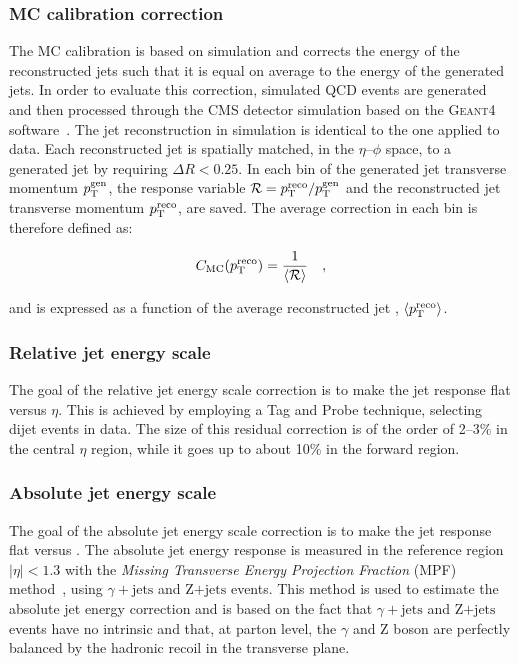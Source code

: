 \subsubsection{MC calibration correction}

The MC calibration is based on simulation and corrects the energy of the reconstructed jets such that it is equal on average to the energy of the generated jets. In order to evaluate this correction, simulated QCD events are generated and then processed through the CMS detector simulation based on the \textsc{Geant4} software~\cite{Agostinelli:2002hh}. The jet reconstruction in simulation is identical to the one applied to data. Each reconstructed jet is spatially matched, in the $\eta$--$\phi$ space, to a generated jet by requiring $\Delta R < 0.25$. In each bin of the generated jet transverse momentum $p_\mathrm{T}^\mathrm{gen}$, the response variable $\mathcal{R}=p_\mathrm{T}^\mathrm{reco}/p_\mathrm{T}^\mathrm{gen}$ and the reconstructed jet transverse momentum $p_\mathrm{T}^\mathrm{reco}$, are saved. The average correction in each bin is therefore defined as:

\begin{equation}
C_\mathrm{MC}(p_\mathrm{T}^\mathrm{reco}) = \frac{1}{\langle \mathcal{R} \rangle} \quad,
\end{equation}

\noindent and is expressed as a function of the average reconstructed jet \pt, $\langle p_\mathrm{T}^\mathrm{reco} \rangle$.

\subsubsection{Relative jet energy scale}

The goal of the relative jet energy scale correction is to make the jet response flat versus $\eta$. This is achieved by employing a Tag and Probe technique, selecting dijet events in data. The size of this residual correction is of the order of 2--3\% in the central $\eta$ region, while it goes up to about 10\% in the forward region.

\subsubsection{Absolute jet energy scale}

The goal of the absolute jet energy scale correction is to make the jet response flat versus \pt. The absolute jet energy response is measured in the reference region $|\eta|<1.3$ with the \emph{Missing Transverse Energy Projection Fraction} (MPF) method~\cite{Abbott:1998xw}, using $\gamma+\mathrm{jets}$ and Z$+\mathrm{jets}$ events. This method is used to estimate the absolute jet energy correction and is based on the fact that $\gamma+\mathrm{jets}$ and Z$+\mathrm{jets}$ events have no intrinsic \MET and that, at parton level, the $\gamma$ and Z boson are perfectly balanced by the hadronic recoil in the transverse plane.


